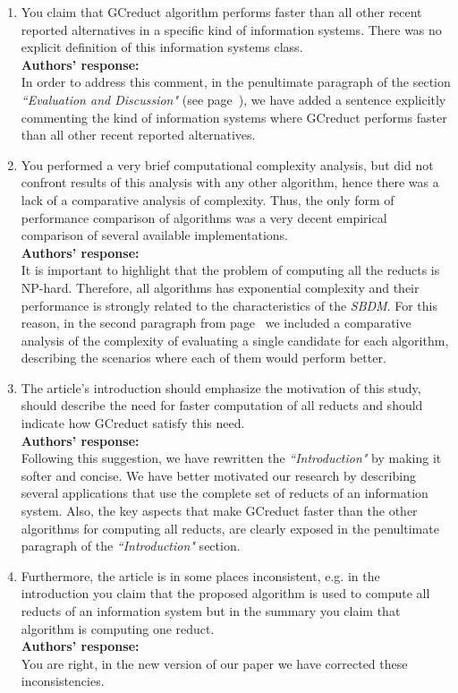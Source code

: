 \documentclass{letter}
\begin{document}
\begin{letter}{}
\begin{enumerate}
	\item You claim that GCreduct algorithm performs faster than all other recent reported alternatives in a specific kind of information systems. There was no explicit definition of this information systems class.\\
	\textbf{Authors’ response:}\\
	In order to address this comment, in the penultimate paragraph of the section \textit{``Evaluation and Discussion"}	(see page~\pageref{par:kind}), we have added a sentence explicitly commenting the kind of information systems where GCreduct  performs faster than all other recent reported alternatives.

	\item You performed a very brief computational complexity analysis, but did not confront results of this analysis with any other algorithm, hence there was a lack of a comparative analysis of complexity. Thus, the only form of performance comparison of algorithms was a very decent empirical comparison of several available implementations.\\
	\textbf{Authors’ response:} \\
	It is important to highlight that the problem of computing all the reducts is NP-hard. Therefore, all algorithms has exponential complexity and their performance is strongly related to the characteristics of the \textit{SBDM}. For this reason, in the second paragraph from page~\pageref{par:complexity} we included a comparative analysis of the complexity of evaluating a single candidate for each algorithm, describing the scenarios where each of them would perform better.
	
	\item The article's introduction should emphasize the motivation of this study, should describe the need for faster computation of all reducts and should indicate how GCreduct satisfy this need.\\
	\textbf{Authors’ response:} \\
	Following this suggestion, we have rewritten the \textit{``Introduction"} by making it softer and concise. We have better motivated our research by describing several applications that use the complete set of reducts of an information system. Also, the key aspects that make GCreduct faster than the other algorithms for computing all reducts, are clearly exposed in the penultimate paragraph of the \textit{``Introduction"} section.
	
	\item Furthermore, the article is in some places inconsistent, e.g. in the introduction you  claim that the proposed algorithm is used to compute all reducts of an information system but in the summary you claim that algorithm is computing one reduct. \\
	\textbf{Authors’ response:} \\
	You are right, in the new version of our paper we have corrected these inconsistencies. 
  \end{enumerate}  
     

\end{letter}
\end{document}
